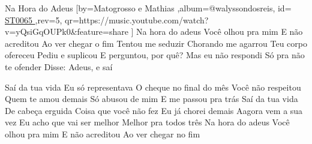 \beginsong
{Na Hora do Adeus %
}[by={Matogrosso e Mathias %
},album={@walyssondosreis},
id={\href{https://music.youtube.com/watch?v=yQsiGqOUPk0&feature=share %
}{ ST0065 %
}},rev={5}, %
qr={https://music.youtube.com/watch?v=yQsiGqOUPk0&feature=share %
}]
\beginverse 
 Na hora do adeus 
Você olhou pra mim
E não acreditou 
Ao ver chegar o fim 
Tentou me seduzir 
Chorando me agarrou
 Teu corpo ofereceu 
Pediu e suplicou 
\endverse
\beginverse 
E perguntou, por quê? 
Mas eu não respondi
 Só pra não te ofender
Disse: Adeus, e saí 
\endverse

\beginchorus
Saí da tua vida
Eu só representava
O cheque no final do mês
Você não respeitou 
Quem te amou demais
Só abusou de mim 
E me passou pra trás 
Saí da tua vida 
De cabeça erguida
Coisa que você não fez
Eu já chorei demais
Aagora vem a sua vez
Eu acho que vai ser melhor
Melhor pra todos três
\endchorus
{}
\beginverse
Na hora do adeus
Você olhou pra mim
E não acreditou 
Ao ver chegar no fim
\endverse

